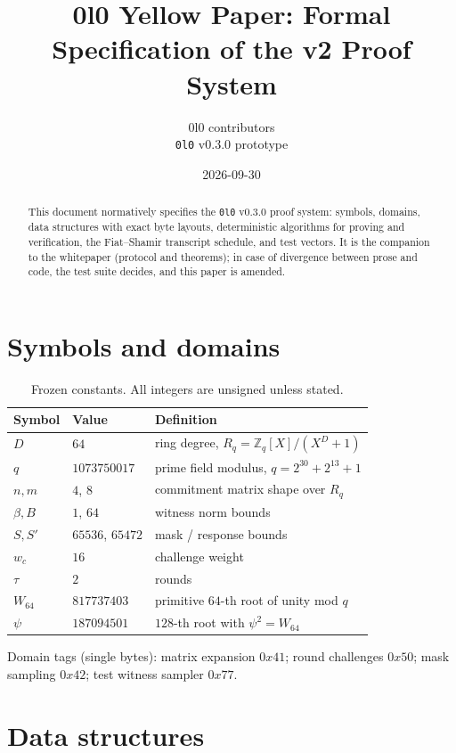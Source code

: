 \documentclass[11pt,a4paper]{article}
\title{0l0 Yellow Paper: Formal Specification of the v2 Proof System}
\author{0l0 contributors\\ \texttt{0l0} v0.3.0 prototype}
\date{2026-09-30}
\begin{document}
\maketitle

\begin{abstract}
This document normatively specifies the \texttt{0l0} v0.3.0 proof
system: symbols, domains, data structures with exact byte layouts,
deterministic algorithms for proving and verification, the Fiat--Shamir
transcript schedule, and test vectors. It is the companion to the
whitepaper (protocol and theorems); in case of divergence between prose
and code, the test suite decides, and this paper is amended.
\end{abstract}

\tableofcontents
\newpage

\section{Symbols and domains}

\begin{table}[h]
\centering
\begin{tabular}{lll}
\toprule
Symbol & Value & Definition \\
\midrule
$D$ & $64$ & ring degree, $R_q = \mathbb{Z}_q[X]/(X^D+1)$ \\
$q$ & $1073750017$ & prime field modulus, $q = 2^{30}+2^{13}+1$ \\
$n, m$ & $4$, $8$ & commitment matrix shape over $R_q$ \\
$\beta, B$ & $1$, $64$ & witness norm bounds \\
$S, S'$ & $65536$, $65472$ & mask / response bounds \\
$w_c$ & $16$ & challenge weight \\
$\tau$ & $2$ & rounds \\
$W_{64}$ & $817737403$ & primitive $64$-th root of unity mod $q$ \\
$\psi$ & $187094501$ & $128$-th root with $\psi^2 = W_{64}$ \\
\bottomrule
\end{tabular}
\caption{Frozen constants. All integers are unsigned unless stated.}
\end{table}

Domain tags (single bytes): matrix expansion $0x41$; round challenges
$0x50$; mask sampling $0x42$; test witness sampler $0x77$.

\section{Data structures}
\end{document}
